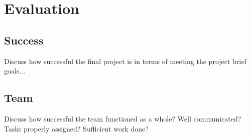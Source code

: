 \chapter{Evaluation}

\section{Success}
Discuss how successful the final project is in terms of meeting the project brief goals...

\section{Team}
Discuss how successful the team functioned as a whole? Well communicated? Tasks properly assigned? Sufficient work done?



